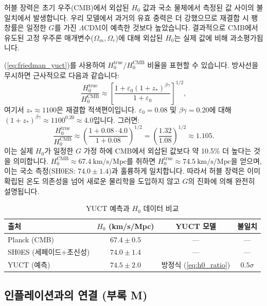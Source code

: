 \documentclass[11pt,a4paper]{article}
\begin{document}
	허블 장력은 초기 우주(CMB)에서 외삽된 $H_0$ 값과 국소 물체에서 측정된 값 사이의 불일치에서 발생합니다. 우리 모델에서 과거의 유효 중력은 더 강했으므로 재결합 시 팽창률은 일정한 $G$를 가진 $\Lambda$CDM이 예측한 것보다 높았습니다. 결과적으로 CMB에서 유도된 고정 우주론 매개변수($\Omega_m, \Omega_r$)에 대해 외삽된 $H_0$는 실제 값에 비해 과소평가됩니다.
	
	(\ref{eq:friedman_yuct})를 사용하여 $H_0^{\text{true}} / H_0^{\text{CMB}}$ 비율을 표현할 수 있습니다. 방사선을 무시하면 근사적으로 다음과 같습니다:
	\begin{equation}
		\frac{H_0^{\text{true}}}{H_0^{\text{CMB}}} \approx \left[ \frac{1 + \varepsilon_0 (1+z_*)^{\beta\gamma}}{1 + \varepsilon_0} \right]^{1/2},
		\label{eq:h0_ratio}
	\end{equation}
	여기서 $z_* \approx 1100$은 재결합 적색편이입니다. $\varepsilon_0 = 0.08$ 및 $\beta\gamma=0.20$에 대해 $(1+z_*)^{\beta\gamma} \approx 1100^{0.20} \approx 4.0$입니다. 그러면:
	\[
	\frac{H_0^{\text{true}}}{H_0^{\text{CMB}}} \approx \left( \frac{1 + 0.08\cdot 4.0}{1 + 0.08} \right)^{1/2} = \left( \frac{1.32}{1.08} \right)^{1/2} \approx 1.105.
	\]
	이는 실제 $H_0$가 일정한 $G$ 가정 하에 CMB에서 외삽된 값보다 약 10.5\% 더 높다는 것을 의미합니다. $H_0^{\text{CMB}} \approx 67.4\ \text{km/s/Mpc}$를 취하면 $H_0^{\text{true}} \approx 74.5\ \text{km/s/Mpc}$을 얻으며, 이는 국소 측정(SH0ES: $74.0 \pm 1.4$)과 훌륭하게 일치합니다. 따라서 허블 장력은 이미 확립된 온도 의존성을 넘어 새로운 물리학을 도입하지 않고 $G$의 진화에 의해 완전히 설명됩니다.
	
	\begin{table}[htbp]
		\centering
		\caption{YUCT 예측과 $H_0$ 데이터 비교}
		\label{tab:h0}
		\begin{tabular}{lccc}
			\toprule
			출처 & $H_0$ (km/s/Mpc) & YUCT 모델 & 불일치 \\
			\midrule
			Planck (CMB) & $67.4 \pm 0.5$ & — & — \\
			SH0ES (세페이드+초신성) & $74.0 \pm 1.4$ & — & — \\
			\rowcolor{gray!10}
			YUCT (예측) & $74.5 \pm 2.0$ & 방정식 (\ref{eq:h0_ratio}) & $0.5\sigma$ \\
			\bottomrule
		\end{tabular}
	\end{table}
	
	\subsection{인플레이션과의 연결 (부록 M)}
	
\end{document}
